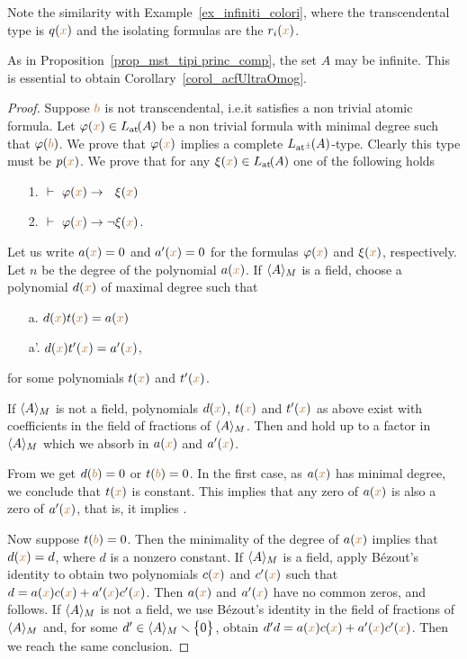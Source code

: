 \documentclass[creche.tex]{subfiles}
\begin{document}
Note the similarity with Example~\ref{ex_infiniti_colori}, where the transcendental type is $q({\color{brown} x})$ and the isolating formulas are the $r_i({\color{brown} x})$. 

As in Proposition~\ref{prop_mst_tipi princ_comp}, the set $A$ may be infinite. This is essential to obtain Corollary~\ref{corol_acfUltraOmog}.


\begin{proof}
Suppose ${\color{brown} b}$ is not transcendental, i.e.\@ it satisfies a non trivial atomic formula. Let $\varphi({\color{brown} x})\in L_{\tiny\rm at}\hskip-.3ex(A)$ be a non trivial formula with minimal degree such that $\varphi({\color{brown} b})$.  We prove that $\varphi({\color{brown} x})$ implies a complete $L_{{\tiny\rm at^\pm}}\hskip-.3ex(A)$-type.  Clearly this type must be $p({\color{brown} x})$. We prove that for any $\xi({\color{brown} x})\in L_{\tiny\rm at}\hskip-.3ex(A)$ one of the following holds
\begin{itemize}
\item[1.] $\ \proves\ \phi({\mr x})\imp\phantom{\neg}\xi({\mr x})$
\item[2.] $\ \proves\ \phi({\mr x})\imp\neg\xi({\mr x})$.
\end{itemize} 
Let us write $a({\color{brown} x})=0$ and $a'({\color{brown} x})=0$ for the formulas $\varphi({\color{brown} x})$ and $\xi({\color{brown} x})$, respectively. Let $n$ be the degree of the polynomial $a({\color{brown} x})$. If $\langle A\rangle_M$ is a field, choose a polynomial $d({\color{brown} x})$ of maximal degree such that
\begin{itemize}
\item[a.] $d({\color{brown} x})t({\color{brown} x})=a({\color{brown} x})$
\item[a'.] $d({\color{brown} x})t'({\color{brown} x})=a'({\color{brown} x})$,
\end{itemize} 
for some polynomials $t({\color{brown} x})$ and $t'({\color{brown} x})$. 

If $\langle A\rangle_M$ is not a field, polynomials $d({\color{brown} x})$, $t({\color{brown} x})$ and $t'({\color{brown} x})$ as above exist with coefficients in the field of fractions of $\langle A\rangle_M$. Then  and  hold up to a factor in $\langle A\rangle_M$ which we absorb in $a({\color{brown} x})$ and $a'({\color{brown} x})$. 

From  we get $d({\color{brown} b})=0$ or $t({\color{brown} b})=0$. In the first case, as $a({\color{brown} x})$ has minimal degree, we conclude that $t({\color{brown} x})$ is constant.  This implies that any zero of $a({\color{brown} x})$ is also a zero of $a'({\color{brown} x})$, that is, it implies . 

Now suppose $t({\color{brown} b})=0$. Then the minimality of the degree of $a({\color{brown} x})$ implies that $d({\color{brown} x})=d$, where $d$ is a nonzero constant. If $\langle A\rangle_M$ is a field, apply B\'ezout's identity to obtain two polynomials $c({\color{brown} x})$ and $c'({\color{brown} x})$ such that $d=a({\color{brown} x})c({\color{brown} x})+a'({\color{brown} x})c'({\color{brown} x})$. Then $a({\color{brown} x})$ and $a'({\color{brown} x})$ have no common zeros, and  follows. If $\langle A\rangle_M$ is not a field, we use  B\'ezout's identity in the field of fractions of $\langle A\rangle_M$ and, for some $d'\in\langle A\rangle_M\smallsetminus\big\{0\big\}$, obtain $d'd=a({\color{brown} x})c({\color{brown} x})+a'({\color{brown} x})c'({\color{brown} x})$. Then we reach the same conclusion.
\end{proof}
\end{document}
